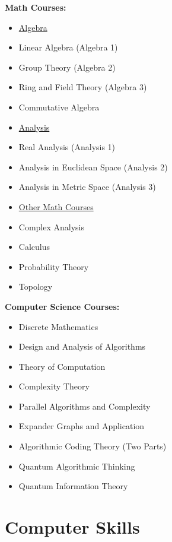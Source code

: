 \documentclass[10pt,a4paper,sans,colorlinks]{moderncv}        %
\newcommand{\itemTitle}[1]{\vspace*{1pt}
	\item[] \underline{#1}\vspace{2pt}
}
\begin{document}
\begin{multicols}{2}
	\textbf{Math Courses:}{}
	\begin{itemize}
		\itemTitle{Algebra}
		\item Linear Algebra (Algebra 1)
		\item Group Theory (Algebra 2)
		\item Ring and  Field Theory (Algebra 3)
		\item Commutative Algebra
		\itemTitle{Analysis}
		\item Real Analysis (Analysis 1)
		\item Analysis in Euclidean Space (Analysis 2)
		\item Analysis in Metric Space (Analysis 3)
		\vspace{3pt}
		\itemTitle{Other Math Courses}
		\item Complex Analysis
		\item Calculus
		\item Probability Theory
		\item Topology
	\end{itemize}
	\columnbreak
	
	\textbf{Computer Science Courses:}{}
	\begin{itemize}
		\item Discrete Mathematics
		\item  Design and Analysis of Algorithms
		\item  Theory of Computation
		\item Complexity Theory
		\item Parallel Algorithms and Complexity
		\item  Expander Graphs and Application
		\item  Algorithmic Coding Theory (Two Parts)
		\item  Quantum Algorithmic Thinking
		\item  Quantum Information Theory
	\end{itemize}
\end{multicols}

\section{Computer Skills}
\end{document}
